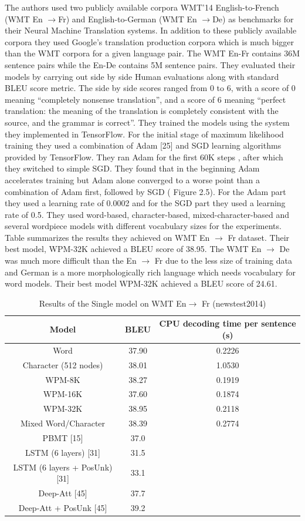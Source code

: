 The authors used two publicly available corpora WMT’14 English-to-French (WMT En $\rightarrow$Fr) and English-to-German (WMT En $\rightarrow$De) as benchmarks for their Neural Machine Translation systems. In addition to these publicly available corpora they used Google’s translation production corpora which is much bigger than the WMT corpora for a given language pair. The WMT En-Fr contains 36M sentence pairs while the En-De contains 5M sentence pairs. They evaluated their models by carrying out side by side Human evaluations along with standard BLEU score metric. The side by side scores ranged from 0 to 6, with a score of 0 meaning “completely nonsense translation”, and a score of 6 meaning “perfect translation: the meaning of the translation is completely consistent with the source, and the grammar is correct”. They trained the models using the system they implemented in TensorFlow. For the initial stage of maximum likelihood training they used a combination of Adam [25] and SGD learning algorithms provided by TensorFlow. They ran Adam for the first 60K steps , after which they switched to simple SGD. They found that in the beginning Adam accelerates training but Adam alone converged to a worse point than a combination of Adam first, followed by SGD ( Figure 2.5). For the Adam part they used a learning rate of 0.0002 and for the SGD part they used a learning rate of 0.5. They used word-based, character-based, mixed-character-based and several wordpiece models with different vocabulary sizes for the experiments. Table summarizes the results they achieved on WMT En $\rightarrow$ Fr dataset. Their best model, WPM-32K achieved a BLEU score of 38.95. The WMT En $\rightarrow$ De was much more difficult than the En $\rightarrow$ Fr due to the less size of training data and German is a more morphologically rich language which needs vocabulary for word models. Their best model WPM-32K achieved a BLEU score of 24.61. 

\begin{table}[h!]
\centering
 \begin{tabular}{ |ccc| } 
  \hline Model & BLEU &  CPU decoding time
per sentence (s) \\ 
  \hline  Word &  37.90 & 0.2226\\
  Character (512 nodes)& 38.01 & 1.0530\\
  WPM-8K & 38.27 &  0.1919\\
  WPM-16K &  37.60 & 0.1874\\
  WPM-32K & 38.95 &  0.2118\\
  Mixed Word/Character & 38.39 &  0.2774\\
  \hline PBMT [15] & 37.0 &\\
  LSTM (6 layers) [31]  &  31.5 & \\
  LSTM (6 layers + PosUnk) [31] &33.1&\\
  Deep-Att [45] &  37.7&\\
  Deep-Att + PosUnk [45] &39.2\\
  \hline
 \end{tabular}
\caption{Results of the Single model on WMT En$\rightarrow$ Fr (newstest2014)}
\end{table}

